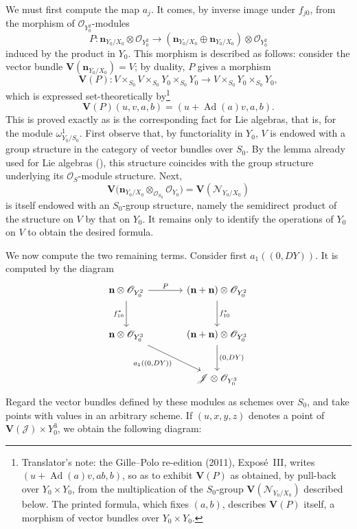 We must first compute the map \(a_j\). It comes, by inverse image under
\(f_{j0}\), from the morphism of \(\mathscr O_{Y_0^2}\)-modules
\[
 P:\mathbf n_{Y_0/X_0}\otimes\mathscr O_{Y_0^2}
 \longrightarrow
 (\mathbf n_{Y_0/X_0}\oplus \mathbf n_{Y_0/X_0})
 \otimes\mathscr O_{Y_0^2}
\]
induced by the product in \(Y_0\). This morphism is described as
follows: consider the vector bundle \(\mathbf V(\mathbf n_{Y_0/X_0})=V\);
by duality, \(P\) gives a morphism
\[
 \mathbf V(P):
 V\times_{S_0}V\times_{S_0}Y_0\times_{S_0}Y_0
 \longrightarrow V\times_{S_0}Y_0\times_{S_0}Y_0,
\]
which is expressed set-theoretically by\footnote{Translator's note: the Gille--Polo re-edition (2011), Exposé~III, writes
\((u+\operatorname{Ad}(a)v,ab,b)\), so as to exhibit \(\mathbf V(P)\) as
obtained, by pull-back over \(Y_0\times Y_0\), from the multiplication of the
\(S_0\)-group \(\mathbf V(\mathscr N_{Y_0/X_0})\) described below. The printed
formula, which fixes \((a,b)\), describes \(\mathbf V(P)\) itself, a morphism of
vector bundles over \(Y_0\times Y_0\).}
\[
 \mathbf V(P)(u,v,a,b)=(u+\operatorname{Ad}(a)v,a,b).
\]
This is proved exactly as is the corresponding fact for Lie algebras,
that is, for the module \(\omega^1_{Y_0/S_0}\). First observe that,
by functoriality in \(Y_0\), \(V\) is endowed with a group structure in
the category of vector bundles over \(S_0\). By the lemma already used
for Lie algebras (), this structure coincides with the
group structure underlying its \(\mathscr O_S\)-module structure. Next,
\[
 \mathbf V\bigl(\mathbf n_{Y_0/X_0}
   \otimes_{\mathscr O_{S_0}}\mathscr O_{Y_0}\bigr)
 =\mathbf V(\mathscr N_{Y_0/X_0})
\]
is itself endowed with an \(S_0\)-group structure, namely the
semidirect product of the structure on \(V\) by that on \(Y_0\). It
remains only to identify the operations of \(Y_0\) on \(V\) to obtain
the desired formula.

We now compute the two remaining terms. Consider first
\(a_1((0,DY))\). It is computed by the diagram
\[
\begin{tikzcd}[column sep=large,row sep=large]
 \mathbf n\otimes\mathscr O_{Y_0^2}\arrow[r,"P"]\arrow[d,"f_{10}^*"']
  &(\mathbf n+\mathbf n)\otimes\mathscr O_{Y_0^2}\arrow[d,"f_{10}^*"]\\
 \mathbf n\otimes\mathscr O_{Y_0^3}\arrow[dr,"{a_1((0,DY))}"']
  &(\mathbf n+\mathbf n)\otimes\mathscr O_{Y_0^3}\arrow[d,"{(0,DY)}"]\\
 &\mathscr J\otimes\mathscr O_{Y_0^3}
\end{tikzcd}
\]
Regard the vector bundles defined by these modules as schemes over
\(S_0\), and take points with values in an arbitrary scheme. If
\((u,x,y,z)\) denotes a point of
\(\mathbf V(\mathscr J)\times Y_0^3\), we obtain the following diagram:

